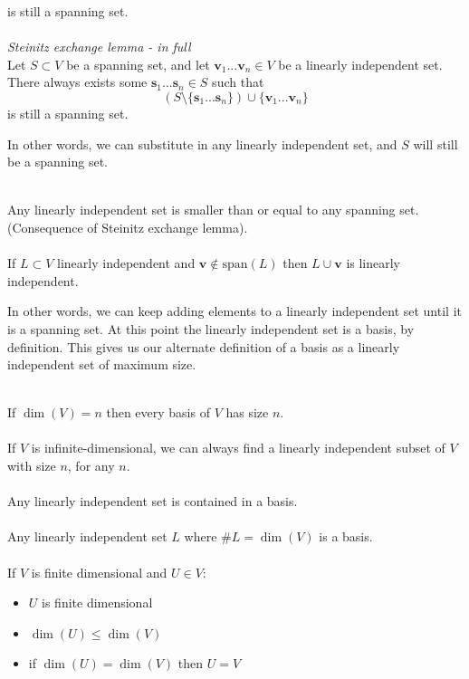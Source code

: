 \documentclass{article}
\renewcommand{\vec}[1]{\mathbf{#1}}
\begin{document}
is still a spanning set.
\\\\
\textit{Steinitz exchange lemma - in full}
\\
Let $ S \subset V $ be a spanning set, and let $ \vec{v}_{1}...\vec{v}_{n} \in V $ be a linearly independent set. There always exists some $ \vec{s}_{1}...\vec{s}_{n} \in S $ such that
\begin{equation}
(S \setminus \{\vec{s}_{1}...\vec{s}_{n}\}) \cup \{\vec{v}_{1}...\vec{v}_{n}\}
\end{equation}
is still a spanning set.
\begin{tcolorbox}[breakable]
In other words, we can substitute in any linearly independent set, and $ S $ will still be a spanning set.
\end{tcolorbox}
\noindent
\\
Any linearly independent set is smaller than or equal to any spanning set. (Consequence of Steinitz exchange lemma).
\\\\
If $ L \subset V $ linearly independent and $ \vec{v} \notin \textrm{span}(L) $ then $ L \cup {\vec{v}} $ is linearly independent.
\begin{tcolorbox}[breakable]
In other words, we can keep adding elements to a linearly independent set until it is a spanning set. At this point the linearly independent set is a basis, by definition. This gives us our alternate definition of a basis as a linearly independent set of maximum size.
\end{tcolorbox}
\noindent
\\
If $ \dim(V) = n $ then every basis of $ V $ has size $ n $.
\\\\
If $ V $ is infinite-dimensional, we can always find a linearly independent subset of $ V $ with size $ n $, for any $ n $.
\\\\
Any linearly independent set is contained in a basis.
\\\\
Any linearly independent set $ L $ where $ \#L = \dim(V) $ is a basis.
\\\\
If $ V $ is finite dimensional and $ U \in V $:
\begin{itemize}
\item $ U $ is finite dimensional
\item $ \dim(U) \leq \dim(V) $
\item if $ \dim(U) = \dim(V) $ then $ U = V $
\end{itemize}
\end{document}
